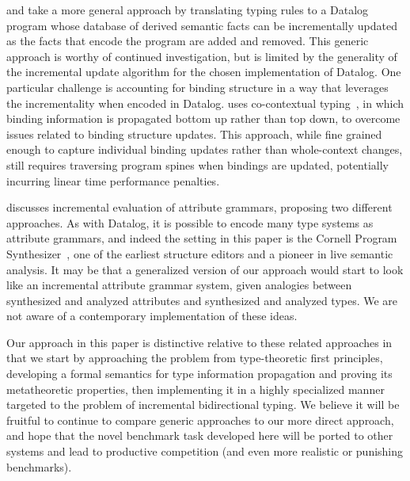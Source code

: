 \citet{DBLP:conf/kbse/SzaboEV16} and \citet{DBLP:journals/pacmpl/PacakES20} take a more general approach by translating typing rules to a Datalog program whose database of derived semantic facts can be incrementally updated as the facts that encode the program are added and removed. This generic approach is worthy of continued investigation, but is limited by the generality of the incremental update algorithm for the chosen implementation of Datalog. One particular challenge is accounting for binding structure in a way that leverages the incrementality when encoded in Datalog.  \citet{DBLP:journals/pacmpl/PacakES20} uses co-contextual typing~\cite{DBLP:conf/oopsla/ErdwegBKKM15}, in which binding information is propagated bottom up rather than top down, to overcome issues related to binding structure updates. This approach, while fine grained enough to capture individual binding updates rather than whole-context changes, still requires traversing program spines when bindings are updated, potentially incurring linear time performance penalties. 

\citet{Demers1981IncrementalEF} discusses incremental evaluation of attribute grammars, proposing two different approaches. As with Datalog, it is possible to encode many type systems as attribute grammars, and indeed the setting in this paper is the Cornell Program Synthesizer~\cite{teitelbaum1981cornell}, one of the earliest structure editors and a pioneer in live semantic analysis. It may be that a generalized version of our approach would start to look like an incremental attribute grammar system, given analogies between synthesized and analyzed attributes and synthesized and analyzed types. We are not aware of a contemporary implementation of these ideas. 

Our approach in this paper is distinctive relative to these related approaches in that we start by approaching the problem from type-theoretic first principles, developing a formal semantics for type information propagation and proving its metatheoretic properties, then implementing it in a highly specialized manner targeted to the problem of incremental bidirectional typing. We believe it will be fruitful to continue to compare generic approaches to our more direct approach, and hope that the novel benchmark task developed here 
will be ported to other systems and lead to productive competition (and even more realistic or punishing benchmarks).


